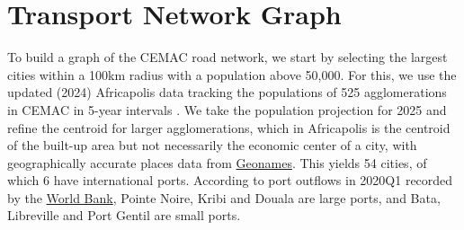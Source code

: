 \documentclass[a4paper]{article}
\begin{document}

\section{Transport Network Graph}


To build a graph of the CEMAC road network, we start by selecting the largest cities within a 100km radius with a population above 50,000. For this, we use the updated (2024) Africapolis data tracking the populations of 525 agglomerations in CEMAC in 5-year intervals \citep{africapolis2024}. We take the population projection for 2025 and refine the centroid for larger agglomerations, which in Africapolis is the centroid of the built-up area but not necessarily the economic center of a city, with geographically accurate places data from \href{https://public.opendatasoft.com/explore/dataset/geonames-all-cities-with-a-population-500/table/?disjunctive.country}{Geonames}. This yields 54 cities, of which 6 have international ports. According to port outflows in 2020Q1 recorded by the \href{https://datacatalog.worldbank.org/search/dataset/0038118/Global---International-Ports}{World Bank}, Pointe Noire, Kribi and Douala are large ports, and Bata, Libreville and Port Gentil are small ports. \newline 
\end{document}
